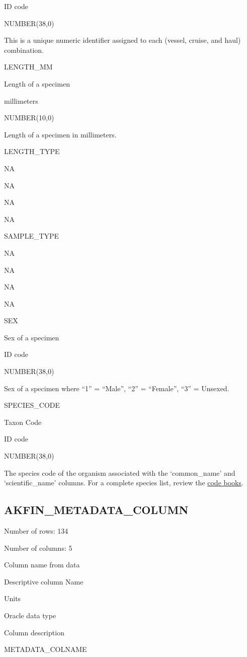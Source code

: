 \documentclass[
  letterpaper,
  oneside,
  open=any]{scrbook}
\begin{document}
ID code

NUMBER(38,0)

This is a unique numeric identifier assigned to each (vessel, cruise,
and haul) combination.

LENGTH\_MM

Length of a specimen

millimeters

NUMBER(10,0)

Length of a specimen in millimeters.

LENGTH\_TYPE

NA

NA

NA

NA

SAMPLE\_TYPE

NA

NA

NA

NA

SEX

Sex of a specimen

ID code

NUMBER(38,0)

Sex of a specimen where ``1'' = ``Male'', ``2'' = ``Female'', ``3'' =
Unsexed.

SPECIES\_CODE

Taxon Code

ID code

NUMBER(38,0)

The species code of the organism associated with the `common\_name' and
`scientific\_name' columns. For a complete species list, review the
\href{https://www.fisheries.noaa.gov/resource/document/groundfish-survey-species-code-manual-and-data-codes-manual}{code
books}.

\hypertarget{akfin_metadata_column}{%
\subsection{AKFIN\_METADATA\_COLUMN}\label{akfin_metadata_column}}

Number of rows: 134

Number of columns: 5

Column name from data

Descriptive column Name

Units

Oracle data type

Column description

METADATA\_COLNAME
\end{document}
